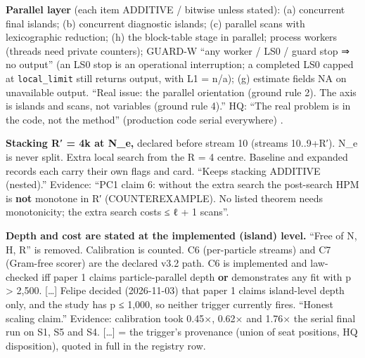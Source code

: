 \par\smallskip\noindent{}
{\textbf{Parallel layer} (each item ADDITIVE / bitwise unless stated): (a) concurrent final islands; (b) concurrent diagnostic
islands; (c) parallel scans with lexicographic reduction; (h) the block-table stage in parallel; process workers (threads need
private counters); GUARD-W ``any worker / LS0 / guard stop ⇒ no output'' (an LS0 stop is an operational interruption; a completed
LS0 capped at \texttt{local\_limit} still returns output, with L1 = n/a); (g) estimate fields NA on unavailable output.
}
{``Real issue: the parallel orientation (ground rule 2). The axis is islands and scans, not variables (ground rule 4).'' HQ:
``The real problem is in the code, not the method'' (production code serial everywhere)
.}

\par\smallskip\noindent{}
{\textbf{Stacking R′ = 4k at N\_e,} declared before stream 10 (streams 10..9+R′). N\_e is never split. Extra local search from the
R = 4 centre. Baseline and expanded records each carry their own flags and card. }
{``Keeps stacking ADDITIVE (nested).'' Evidence: ``PC1 claim 6: without the extra search the post-search HPM is \textbf{not}
monotone in R′ (COUNTEREXAMPLE). No listed theorem needs monotonicity; the extra search costs ≤ ℓ + 1 scans''.}

\par\smallskip\noindent{}
{\textbf{Depth and cost are stated at the implemented (island) level.} ``Free of N, H, R'' is removed. Calibration is counted. C6
(per-particle streams) and C7 (Gram-free scorer) are the declared v3.2 path. C6 is implemented and law-checked iff paper 1 claims
particle-parallel depth \textbf{or} demonstrates any fit with p > 2,500. [\dots] Felipe decided (2026-11-03) that paper 1 claims
island-level depth only, and the study has p ≤ 1,000, so neither trigger currently fires.
}
{``Honest scaling claim.'' Evidence: calibration took 0.45×, 0.62× and 1.76× the serial final run on S1, S5 and S4. [\dots] =
the trigger's provenance (union of seat positions, HQ disposition), quoted in full in the registry row.}


